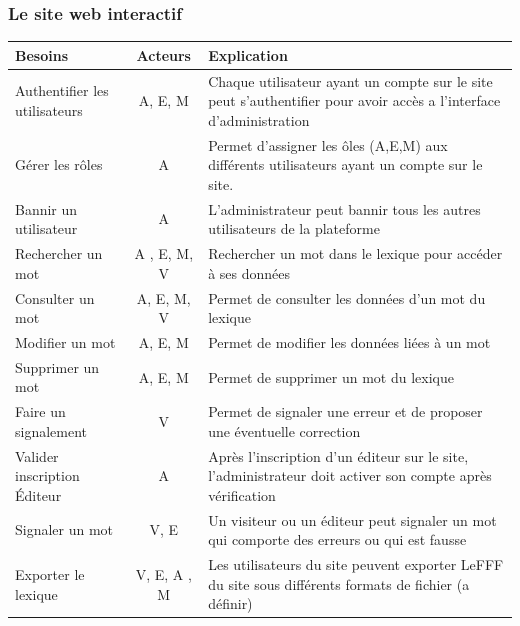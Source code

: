 \documentclass[12pt,a4paper]{article}
\begin{document}
\subsubsection{Le site web interactif}
\begin{tabularx}{\textwidth}{|l|c|X|}
  \hline
  \textbf{Besoins} & 
  \textbf{Acteurs} & 
  \textbf{Explication} \\
  \hline
  Authentifier les utilisateurs & 
  A, E, M & 
  Chaque utilisateur ayant un compte sur le site peut s'authentifier pour avoir accès a l'interface d'administration \\ 
  \hline
  Gérer les rôles & A
   & Permet d'assigner les ôles (A,E,M) aux différents utilisateurs ayant un compte sur le site.
 \\
  \hline
  Bannir un utilisateur& 
  A & 
  L'administrateur peut bannir tous les autres utilisateurs de la plateforme \\
  \hline
  Rechercher un mot & 
  A , E, M, V & 
  Rechercher un mot dans le lexique pour accéder à ses données \\
  \hline
  Consulter un mot &
  A, E, M, V &
  Permet de consulter les données d'un mot du lexique \\
  \hline
  Modifier un mot &
  A, E, M & 
  Permet de modifier les données liées à un mot \\
  \hline
  Supprimer un mot &
  A, E, M & 
  Permet de supprimer un mot du lexique \\
  \hline
  Faire un signalement & 
  V &
  Permet de signaler une erreur et de proposer une éventuelle correction \\
  \hline
  Valider inscription Éditeur &
  A &
  Après l'inscription d'un éditeur sur le site, l'administrateur doit activer son compte après vérification \\
  \hline
  Signaler un mot &
  V, E &
  Un visiteur ou un éditeur peut signaler un mot qui comporte des erreurs ou qui est fausse \\
  \hline
  Exporter le lexique &
  V, E, A , M &
  Les utilisateurs du site peuvent exporter LeFFF du site sous différents formats de fichier (a définir)\\
  \hline
\end{tabularx}
\end{document}
